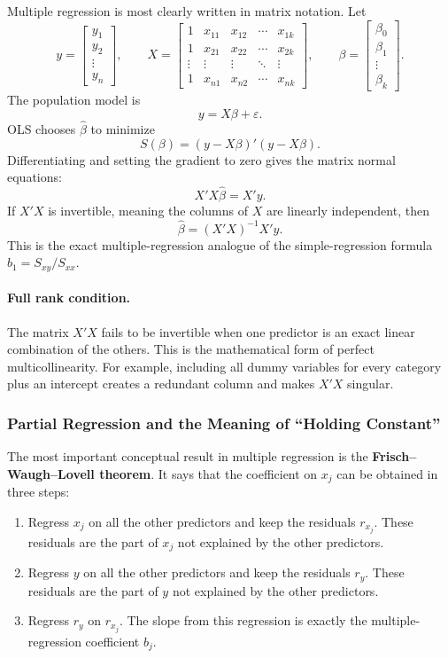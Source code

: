 \documentclass[12pt,openany]{book}
\begin{document}
Multiple regression is most clearly written in matrix notation. Let
\[
y=\begin{bmatrix}y_1\\y_2\\\vdots\\y_n\end{bmatrix},\qquad
X=\begin{bmatrix}
1&x_{11}&x_{12}&\cdots&x_{1k}\\
1&x_{21}&x_{22}&\cdots&x_{2k}\\
\vdots&\vdots&\vdots&\ddots&\vdots\\
1&x_{n1}&x_{n2}&\cdots&x_{nk}
\end{bmatrix},\qquad
\beta=\begin{bmatrix}\beta_0\\\beta_1\\\vdots\\\beta_k\end{bmatrix}.
\]
The population model is
\[
y=X\beta+\varepsilon.
\]
OLS chooses \(\hat{\beta}\) to minimize
\[
S(\beta)=(y-X\beta)'(y-X\beta).
\]
Differentiating and setting the gradient to zero gives the matrix normal equations:
\[
X'X\hat{\beta}=X'y.
\]
If \(X'X\) is invertible, meaning the columns of \(X\) are linearly independent, then
\[
\hat{\beta}=(X'X)^{-1}X'y.
\]
This is the exact multiple-regression analogue of the simple-regression formula \(b_1=S_{xy}/S_{xx}\).

\paragraph{Full rank condition.}
The matrix \(X'X\) fails to be invertible when one predictor is an exact linear combination of the others. This is the mathematical form of perfect multicollinearity. For example, including all dummy variables for every category plus an intercept creates a redundant column and makes \(X'X\) singular.

\subsubsection{Partial Regression and the Meaning of ``Holding Constant''}

The most important conceptual result in multiple regression is the \textbf{Frisch--Waugh--Lovell theorem}. It says that the coefficient on \(x_j\) can be obtained in three steps:
\begin{enumerate}[leftmargin=*]
    \item Regress \(x_j\) on all the other predictors and keep the residuals \(r_{x_j}\). These residuals are the part of \(x_j\) not explained by the other predictors.
    \item Regress \(y\) on all the other predictors and keep the residuals \(r_y\). These residuals are the part of \(y\) not explained by the other predictors.
    \item Regress \(r_y\) on \(r_{x_j}\). The slope from this regression is exactly the multiple-regression coefficient \(b_j\).
\end{enumerate}
\end{document}
